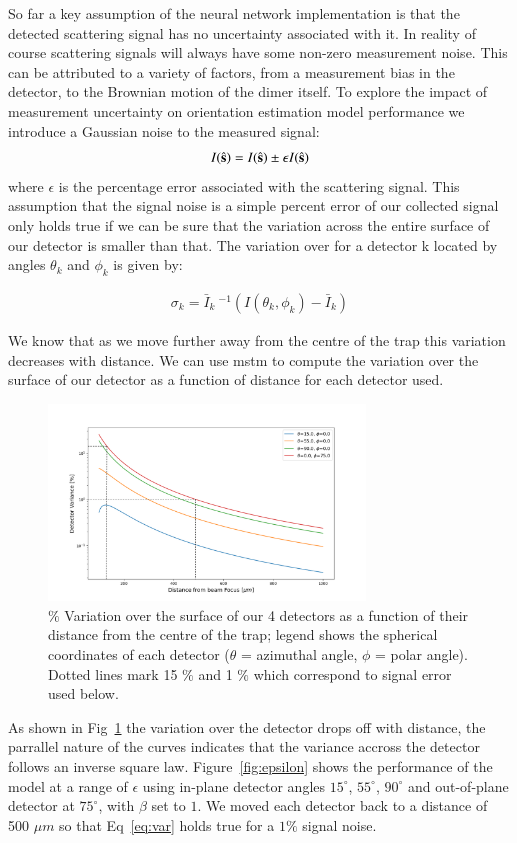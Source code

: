 \documentclass[preprint,  3p]{elsarticle}
\begin{document}
So far a key assumption of the neural network implementation is that the detected scattering signal has no uncertainty associated with it. In reality of course scattering signals will always have some non-zero measurement noise. This can be attributed to a variety of factors, from a measurement bias in the detector, to the Brownian motion of the dimer itself. To explore the impact of measurement uncertainty on orientation estimation model performance we introduce a Gaussian noise to the measured signal:
\begin{align}
	\label{eq:var}
	I(\hat{\bf s}) = I(\hat{\bf s}) \pm \epsilon I(\hat{\bf s})
\end{align}
where $\epsilon$ is the percentage error associated with the scattering signal. This assumption that the signal noise is a simple percent error of our collected signal only holds true if we can be sure that the variation across the entire surface of our detector is smaller than that. The variation over for a detector k located by angles $\theta_k$ and $\phi_k$ is given by:

\begin{align}
	\sigma_k = {\bar{I}_k} \ ^{-1}(I(\theta_k, \phi_k)-\bar{I}_k)
\end{align}

We know that as we move further away from the centre of the trap this variation decreases with distance. We can use mstm to compute the variation over the surface of our detector as a function of distance for each detector used. 

\begin{figure}[h]
	\centering
	\includegraphics[width=0.75\textwidth]{./Images/Detector vs distance_modified.png}
	\caption{$\%$ Variation over the surface of our 4 detectors as a function of their distance from the centre of the trap; legend shows the spherical coordinates of each detector ($\theta$ = azimuthal angle, $\phi$ = polar angle). Dotted lines mark 15 $\%$ and 1 $\%$ which correspond to signal error used below.}
	\label{fig:detector}
\end{figure}
As shown in Fig~\ref{fig:detector} the variation over the detector drops off with distance, the parrallel nature of the curves indicates that the variance accross the detector follows an inverse square law. Figure~\ref{fig:epsilon} shows the performance of the model at a range of $\epsilon$ using in-plane detector angles $15^{\circ}$, $55^{\circ}$, $90^{\circ}$ and out-of-plane detector at $75^{\circ}$, with $\beta$ set to $1$. We moved each detector back to a distance of 500 $\mu m$ so that Eq~\ref{eq:var} holds true for a $1 \%$ signal noise.
\end{document}
